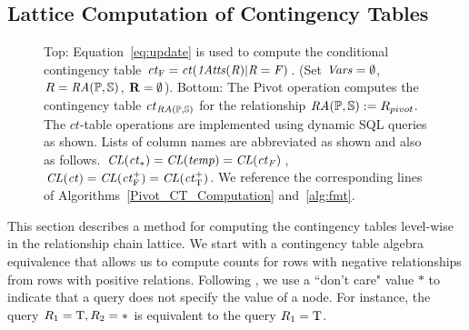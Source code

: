 \documentclass{sig-alternate-2013}
\newcommand{\ct}{\mathit{ct}}
\begin{document}
\subsection{Lattice Computation of Contingency Tables} \label{sec:mobius}
\begin{figure}[tb]
\begin{center}

\caption{Top: Equation~\eqref{eq:update} is used to compute the conditional contingency table $\ct_{\false} = \ct(\eatts(R)|R = F)$. (Set $\it{Vars} = \emptyset$, $R = \mathit{RA}(\mathbb{P},\mathbb{S})$, $\mathbf{R} = \emptyset$). Bottom: 
The Pivot operation computes the contingency table $\ct_{\ra(\P,\S)}$ for the relationship $\mathit{RA}(\mathbb{P},\mathbb{S}) := R_{pivot}$. The $\ct$-table operations are implemented using dynamic SQL queries as shown. Lists of column names are abbreviated as shown and also as follows.
$\ColumnList({\ct_{*}}) = \ColumnList({temp})=\ColumnList({\ct_{F}})$, 
$\ColumnList({\ct}) =  \ColumnList(\ct_{\false}^{+})  = \ColumnList(\ct_{\true}^{+}) $. We reference the corresponding lines of Algorithms~\ref{Pivot_CT_Computation} and~\ref{alg:fmt}.
\label{fig:flow}}
\end{center}
\end{figure}

This section describes a method for computing the contingency tables level-wise in the relationship chain lattice. We start with a contingency table algebra equivalence that allows us to compute counts for rows with negative relationships from rows with positive relations.
Following \cite{Moore1998}, we use a ``don't care" value $*$ to indicate that a query does not specify the value of a node. For instance, the query $R_{1} = \mathrm{T}, R_{2} = *$ is equivalent to the query $R_{1} = \mathrm{T}$. 
\end{document}
